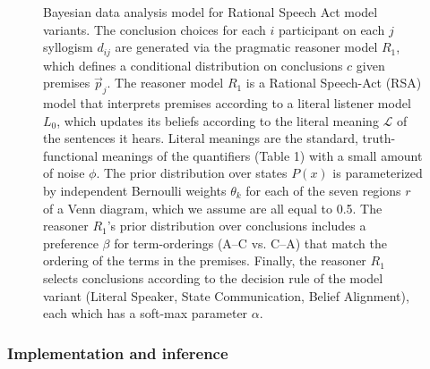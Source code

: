 \documentclass[floatsintext, man]{apa6}
\begin{document}
\begin{figure}[ht!]
\begin{center}
\begin{tabular}{cc}
    \end{tabular}
  \end{center}
  \caption{\small Bayesian data analysis model for Rational Speech Act model variants. The conclusion choices for each $i$ participant on each $j$ syllogism $d_{ij}$ are generated via the pragmatic reasoner model $R_1$, which defines a conditional distribution on conclusions $c$ given premises $\vec{p}_j$. The reasoner model $R_1$ is a Rational Speech-Act (RSA) model that interprets premises according to a literal listener model $L_0$, which updates its beliefs according to the literal meaning $\mathcal{L}$ of the sentences it hears. Literal meanings are the standard, truth-functional meanings of the quantifiers (Table 1\label{tab:sem}) with a small amount of noise $\phi$. The prior distribution over states $P(x)$ is parameterized by independent Bernoulli weights $\theta_k$ for each of the seven regions $r$ of a Venn diagram, which we assume are all equal to 0.5. The reasoner $R_1$'s prior distribution over conclusions includes a preference $\beta$ for term-orderings (A--C vs. C--A) that match the ordering of the terms in the premises. Finally, the reasoner $R_1$ selects conclusions according to the decision rule of the model variant (Literal Speaker, State Communication, Belief Alignment), each which has a soft-max parameter $\alpha$.}
  \label{fig:bayesnet}
\end{figure}

\subsubsection{Implementation and inference}
\end{document}
